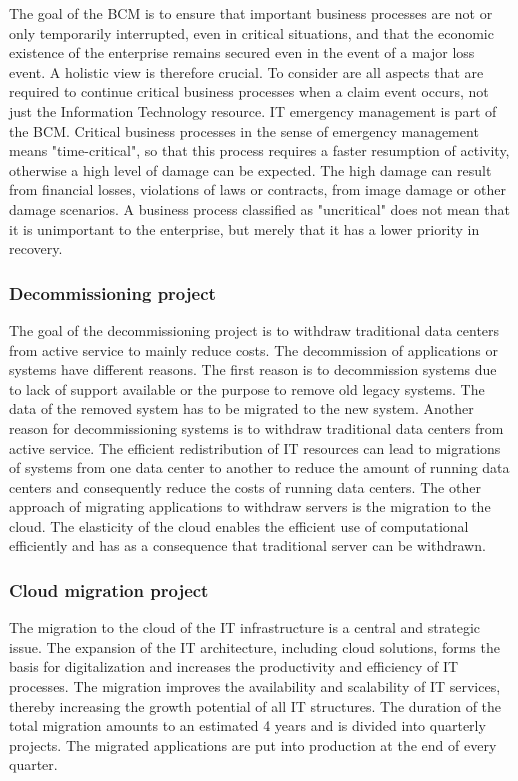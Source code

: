 The goal of the BCM is to ensure that important business processes are not or only temporarily interrupted, even in critical situations, and that the economic existence of the enterprise remains secured even in the event of a major loss event. A holistic view is therefore crucial. To consider are all aspects that are required to continue critical business processes when a claim event occurs, not just the Information Technology resource. IT emergency management is part of the BCM.
Critical business processes in the sense of emergency management means "time-critical", so that this process requires a faster resumption of activity, otherwise a high level of damage can be expected. The high damage can result from financial losses, violations of laws or contracts, from image damage or other damage scenarios.
A business process classified as "uncritical" does not mean that it is unimportant to the enterprise, but merely that it has a lower priority in recovery.

\subsubsection{Decommissioning project}

The goal of the decommissioning project is to withdraw traditional data centers from active service to mainly reduce costs. The decommission of applications or systems have different reasons. The first reason is to decommission systems due to lack of support available or the purpose to remove old legacy systems. The data of the removed system has to be migrated to the new system. Another reason for decommissioning systems is to withdraw traditional data centers from active service. The efficient redistribution of IT resources can lead to migrations of systems from one data center to another to reduce the amount of running data centers and consequently reduce the costs of running data centers. The other approach of migrating applications to withdraw servers is the migration to the cloud. The elasticity of the cloud enables the efficient use of computational efficiently and has as a consequence that traditional server can be withdrawn.

\subsubsection{Cloud migration project}
The migration to the cloud of the IT infrastructure is a central and strategic issue. The expansion of the IT architecture, including cloud solutions, forms the basis for digitalization and increases the productivity and efficiency of IT processes. The migration improves the availability and scalability of IT services, thereby increasing the growth potential of all IT structures. The duration of the total migration amounts to an estimated 4 years and is divided into quarterly projects. The migrated applications are put into production at the end of every quarter.

